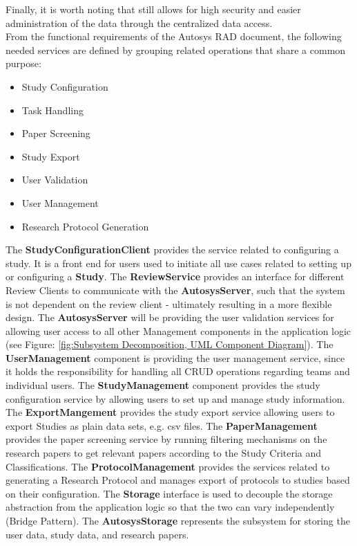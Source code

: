 Finally, it is worth noting that still allows for high security and easier administration of the data through the centralized data access.\\
From the functional requirements of the Autosys RAD document, the following needed services are defined by grouping related operations that share a common purpose:\\
\begin{itemize}
	\item Study Configuration
	\item Task Handling
	\item Paper Screening
	\item Study Export
	\item User Validation
	\item User Management
	\item Research Protocol Generation
\end{itemize}
The \textbf{StudyConfigurationClient} provides the service related to configuring a study. It is a front end for users used to initiate all use cases related to setting up or configuring a \textbf{Study}.
The \textbf{ReviewService} provides an interface for different Review Clients to communicate with the \textbf{AutosysServer}, such that the system is not dependent on the review client - ultimately resulting in a more flexible design.
The \textbf{AutosysServer} will be providing the user validation services for allowing user access to all other Management components in the application logic (see Figure: \ref{fig:Subsystem Decomposition, UML Component Diagram}).
The \textbf{UserManagement} component is providing the user management service, since it holds the responsibility for handling all CRUD operations regarding teams and individual users. The \textbf{StudyManagement} component  provides the study configuration service by allowing users to set up and manage study information.
The \textbf{ExportMangement} provides the study export service allowing users to export Studies as plain data sets, e.g. csv files.
The \textbf{PaperManagement} provides the paper screening service by running filtering mechanisms on the research papers to get relevant papers according to the Study Criteria and Classifications.
The \textbf{ProtocolManagement} provides the services related to generating a Research Protocol and manages export of protocols to studies based on their configuration. 
The\textbf{ Storage} interface is used to decouple the storage abstraction from the application logic so that the two can vary independently (Bridge Pattern). 
The \textbf{AutosysStorage} represents the subsystem for storing the user data, study data, and research papers.
